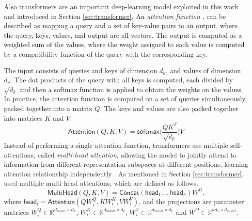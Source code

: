 \documentclass{article}
\begin{document}
	
	Also transformers are an important deep-learning model exploited in this work and introduced in 
	Section \ref{sec:transformer}. 	
	An \textit{attention function} \cite{vaswani2017attention}, can be described as mapping a query and 
	a set of key-value pairs to an output, where the query, keys, values, and output are all vectors. The 
	output is computed as a weighted sum of the values, where the weight assigned to each value is 
	computed by a compatibility function of the query with the corresponding key.
	
	The input consists of queries and keys of dimension $d_k$, and values of dimension $d_v$. The dot 
	products of the query with all keys is computed, each divided by $\sqrt{d_k}$ and then a 
	softmax function is applied to obtain the weights on the values.
	In practice, the attention function is computed on a set of queries simultaneously, packed together 
	into a matrix $Q$. The keys and values are also packed together into matrices $K$ and $V$. 
	\begin{equation}
		\label{eqn:attention}
		\mathsf{Attention}(Q, K, V) = \mathsf{softmax} \big( \frac{QK^T}{\sqrt{d_k}}\big)V
	\end{equation}
	Instead of performing a single attention function, transformers use multiple self-attentions, called 
	\textit{multi-head attention}, allowing the model to jointly attend to information from different 
	representation subspaces at different positions, learning attention relationship independently	
	\cite{vaswani2017attention}.
	As mentioned in	Section \ref{sec:transformer}, \citet{vaswani2017attention} used multiple 
	multi-head 
	attentions, which are defined as follows.
	\begin{equation}
		\label{eqn:multihead}
		{\mathsf{MultiHead}(Q, K, V) = \mathsf{Concat}(\mathsf{head}_1 \dots, 
			\mathsf{head}_h) W^O }
		\mbox{,}
	\end{equation}
	where $ \mathsf{head}_i = \mathsf{Attention}(QW_i^Q, KW_i^K , VW_i^V)$, and the 
	projections are parameter matrices $W_i^Q \in \mathbb{R}^{d_{\text{model}}\times 
		d_k}$, $W_i^K \in \mathbb{R}^{d_{\text{model}}\times d_k}$, $W_i^V \in 
	\mathbb{R}^{d_{\text{model}}\times d_v}$ and $W^O \in \mathbb{R}^{hd_v \times 
		d_{\text{model}}}$.
	
\end{document}
